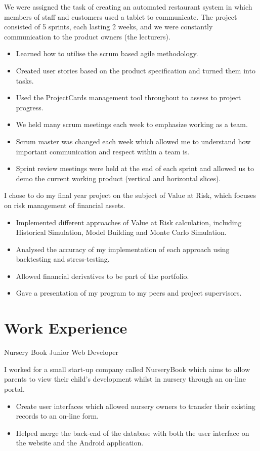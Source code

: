 \documentclass[10pt,a4paper]{moderncv}
\begin{document}
{
	We were assigned the task of creating an automated restaurant system in which members of staff and customers used a tablet to communicate. The project consisted of 5 sprints, each lasting 2 weeks, and we were constantly communication to the product owners (the lecturers).
	\begin{itemize}
		\item Learned how to utilise the scrum based agile methodology.
		\item Created user stories based on the product specification and turned them into tasks.
		\item Used the ProjectCards management tool throughout to assess to project progress.
		\item We held many scrum meetings each week to emphasize working as a team.
		\item Scrum master was changed each week which allowed me to understand how important communication and respect within a team is.
		\item Sprint review meetings were held at the end of each sprint and allowed us to demo the current working product (vertical and horizontal slices).
	\end{itemize}
}
{
	I chose to do my final year project on the subject of Value at Risk, which focuses on risk management of financial assets.
	\begin{itemize}
		\item Implemented different approaches of Value at Risk calculation, including Historical Simulation, Model Building and Monte Carlo Simulation.
		\item Analysed the accuracy of my implementation of each approach using backtesting and stress-testing.
		\item Allowed financial derivatives to be part of the portfolio.
		\item Gave a presentation of my program to my peers and project supervisors.
	\end{itemize}
}

\section{Work Experience}
{Nursery Book}
{Junior Web Developer}
{}
{}
{
	I worked for a small start-up company called NurseryBook which aims to allow parents to view their child's development whilst in nursery through an on-line portal.
	\begin{itemize}
		\item Create user interfaces which allowed nursery owners to transfer their existing records to an on-line form.
		\item Helped merge the back-end of the database with both the user interface on the website and the Android application.
	\end{itemize}
}
\end{document}
